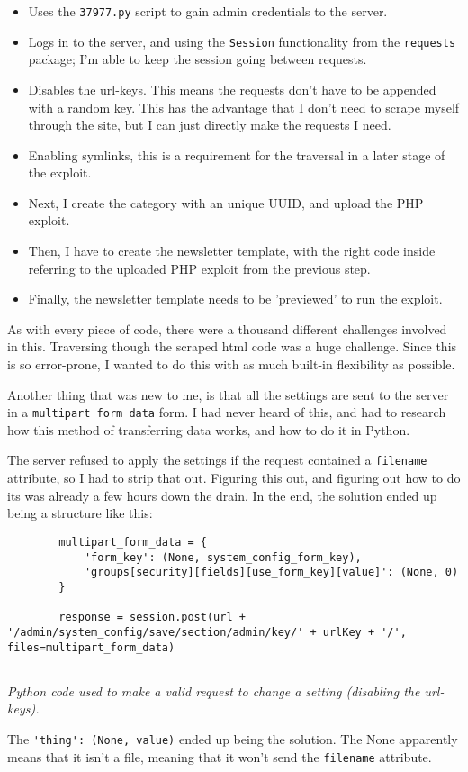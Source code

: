 \begin{itemize}
    \item Uses the \verb|37977.py| script to gain admin credentials to the server.
    \item Logs in to the server, and using the \verb|Session| functionality from the \verb|requests| package; I'm able to keep the session going between requests.
    \item Disables the url-keys. This means the requests don't have to be appended with a random key. This has the advantage that I don't need to scrape myself through the site, but I can just directly make the requests I need.
    \item Enabling symlinks, this is a requirement for the traversal in a later stage of the exploit.
    \item Next, I create the category with an unique UUID, and upload the PHP exploit.
    \item Then, I have to create the newsletter template, with the right code inside referring to the uploaded PHP exploit from the previous step.
    \item Finally, the newsletter template needs to be 'previewed' to run the exploit.
\end{itemize}

As with every piece of code, there were a thousand different challenges involved in this. Traversing though the scraped html code was a huge challenge. Since this is so error-prone, I wanted to do this with as much built-in flexibility as possible.

Another thing that was new to me, is that all the settings are sent to the server in a \verb|multipart form data| form. I had never heard of this, and had to research how this method of transferring data works, and how to do it in Python.

The server refused to apply the settings if the request contained a \verb|filename| attribute, so I had to strip that out. Figuring this out, and figuring out how to do its was already a few hours down the drain. In the end, the solution ended up being a structure like this:

\begin{listing}
    \begin{verbatim}
        multipart_form_data = {
            'form_key': (None, system_config_form_key),
            'groups[security][fields][use_form_key][value]': (None, 0)
        }
    
        response = session.post(url + '/admin/system_config/save/section/admin/key/' + urlKey + '/', files=multipart_form_data)
    
    \end{verbatim}
    \caption{\emph{Python code used to make a valid request to change a setting (disabling the url-keys).}}
\end{listing}



The \verb|'thing': (None, value)| ended up being the solution. The None apparently means that it isn't a file, meaning that it won't send the \verb|filename| attribute.